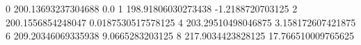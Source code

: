 0 200.13693237304688 0.0
1 198.91806030273438 -1.2188720703125
2 200.1556854248047 0.0187530517578125
4 203.29510498046875 3.158172607421875
6 209.20346069335938 9.0665283203125
8 217.9034423828125 17.766510009765625
